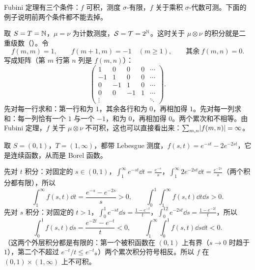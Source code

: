 
Fubini 定理有三个条件：$f$ 可积，测度 $\sigma$-有限，$f$ 关于乘积 $\sigma$-代数可测。下面的例子说明前两个条件都不能去掉。

\begin{example}\label{ex:product:double-series}
取 $S=T=\mathbb{N}$，$\mu=\nu$ 为计数测度，$\mathcal{S}=\mathcal{T}=2^{\mathbb{N}}$。这时关于 $\mu\otimes\nu$ 的积分就是二重级数（）。令
\[
f(m,m)=1,\qquad f(m+1,m)=-1\quad(m\geqslant1),\qquad\text{其余}\ f(m,n)=0 .
\]
写成矩阵（第 $m$ 行第 $n$ 列是 $f(m,n)$）：
\[
\begin{pmatrix}1&0&0&0&\cdots\\-1&1&0&0&\cdots\\0&-1&1&0&\cdots\\0&0&-1&1&\cdots\\\vdots&&&&\ddots\end{pmatrix}.
\]
先对每一行求和：第一行和为 $1$，其余各行和为 $0$，再相加得 $1$。先对每一列求和：每一列恰有一个 $1$ 与一个 $-1$，和为 $0$，再相加得 $0$。两个累次和不相等。由 Fubini 定理，$f$ 关于 $\mu\otimes\nu$ 不可积，这也可以直接看出来：$\sum_{m,n}\lvert f(m,n)\rvert=\infty$。
\end{example}

\begin{example}[连续函数的例子]\label{ex:product:exp-counterexample}
取 $S=(0,1)$，$T=(1,\infty)$，都带 Lebesgue 测度，$f(s,t)=e^{-st}-2e^{-2st}$，它是连续函数，从而是 Borel 函数。

先对 $t$ 积分：对固定的 $s\in(0,1)$，$\int_1^\infty e^{-st}\dd t=\frac{e^{-s}}s$，$\int_1^\infty2e^{-2st}\dd t=\frac{e^{-2s}}s$（两个积分都有限），所以
\[
\int_1^\infty f(s,t)\dd t=\frac{e^{-s}-e^{-2s}}s>0,\qquad\int_0^1\int_1^\infty f(s,t)\dd t\dd s>0 .
\]
先对 $s$ 积分：对固定的 $t>1$，$\int_0^1e^{-st}\dd s=\frac{1-e^{-t}}t$，$\int_0^12e^{-2st}\dd s=\frac{1-e^{-2t}}t$，所以
\[
\int_0^1f(s,t)\dd s=\frac{e^{-2t}-e^{-t}}t<0,\qquad\int_1^\infty\int_0^1f(s,t)\dd s\dd t<0 .
\]
（这两个外层积分都是有限的：第一个被积函数在 $(0,1)$ 上有界（$s\to0$ 时趋于 $1$），第二个不超过 $e^{-t}/t\leqslant e^{-t}$。）两个累次积分符号相反。所以 $f$ 在 $(0,1)\times(1,\infty)$ 上不可积。
\end{example}

